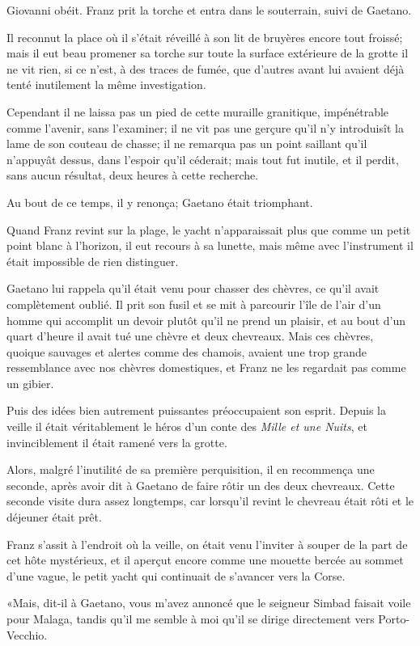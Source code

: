 Giovanni obéit. Franz prit la torche et entra dans le souterrain, suivi de Gaetano. 

Il reconnut la place où il s'était réveillé à son lit de bruyères encore tout froissé; mais il eut beau promener sa torche sur toute la surface extérieure de la grotte il ne vit rien, si ce n'est, à des traces de fumée, que d'autres avant lui avaient déjà tenté inutilement la même investigation. 

Cependant il ne laissa pas un pied de cette muraille granitique, impénétrable comme l'avenir, sans l'examiner; il ne vit pas une gerçure qu'il n'y introduisît la lame de son couteau de chasse; il ne remarqua pas un point saillant qu'il n'appuyât dessus, dans l'espoir qu'il céderait; mais tout fut inutile, et il perdit, sans aucun résultat, deux heures à cette recherche. 

Au bout de ce temps, il y renonça; Gaetano était triomphant. 

Quand Franz revint sur la plage, le yacht n'apparaissait plus que comme un petit point blanc à l'horizon, il eut recours à sa lunette, mais même avec l'instrument il était impossible de rien distinguer. 

Gaetano lui rappela qu'il était venu pour chasser des chèvres, ce qu'il avait complètement oublié. Il prit son fusil et se mit à parcourir l'île de l'air d'un homme qui accomplit un devoir plutôt qu'il ne prend un plaisir, et au bout d'un quart d'heure il avait tué une chèvre et deux chevreaux. Mais ces chèvres, quoique sauvages et alertes comme des chamois, avaient une trop grande ressemblance avec nos chèvres domestiques, et Franz ne les regardait pas comme un gibier. 

Puis des idées bien autrement puissantes préoccupaient son esprit. Depuis la veille il était véritablement le héros d'un conte des \textit{Mille et une Nuits}, et invinciblement il était ramené vers la grotte. 

Alors, malgré l'inutilité de sa première perquisition, il en recommença une seconde, après avoir dit à Gaetano de faire rôtir un des deux chevreaux. Cette seconde visite dura assez longtemps, car lorsqu'il revint le chevreau était rôti et le déjeuner était prêt. 

Franz s'assit à l'endroit où la veille, on était venu l'inviter à souper de la part de cet hôte mystérieux, et il aperçut encore comme une mouette bercée au sommet d'une vague, le petit yacht qui continuait de s'avancer vers la Corse. 

«Mais, dit-il à Gaetano, vous m'avez annoncé que le seigneur Simbad faisait voile pour Malaga, tandis qu'il me semble à moi qu'il se dirige directement vers Porto-Vecchio. 

